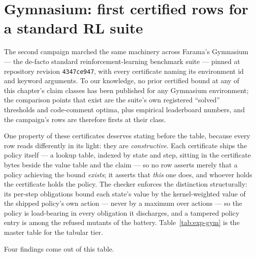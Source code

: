 \section{Gymnasium: first certified rows for a standard RL suite}
\label{sec:exp-gym}

The second campaign marched the same machinery across Farama's
Gymnasium --- the de-facto standard reinforcement-learning benchmark
suite --- pinned at repository revision \texttt{4347ce947}, with every
certificate naming its environment id and keyword arguments. To our
knowledge, no prior certified bound at any of this chapter's claim
classes has been published for any Gymnasium environment; the
comparison points that exist are the suite's own registered
``solved'' thresholds and code-comment optima, plus empirical
leaderboard numbers, and the campaign's rows are therefore firsts at
their class.

One property of these certificates deserves stating before the table,
because every row reads differently in its light: they are
\emph{constructive}. Each certificate ships the policy itself --- a
lookup table, indexed by state and step, sitting in the certificate
bytes beside the value table and the claim --- so no row asserts
merely that a policy achieving the bound \emph{exists}; it asserts
that \emph{this} one does, and whoever holds the certificate holds the
policy. The checker enforces the distinction structurally: its
per-step obligations bound each state's value by the kernel-weighted
value of the shipped policy's own action --- never by a maximum over
actions --- so the policy is load-bearing in every obligation it
discharges, and a tampered policy entry is among the refused mutants
of the battery. Table~\ref{tab:exp-gym} is the master table for the
tabular tier.

\begin{table}[htbp]
\centering\small

\caption{Certified rows for the Gymnasium tabular tier. The claim
column names the species of section~\ref{sec:exp-claims}: U2 is a
certified cost-to-goal, U3 an exact probabilistic bound. Policies are
shipped lookup tables; checks are single-core medians. ``Optimal,
exactly'' means the bound is the exact optimum of the
(deadline-truncated) environment: terminal at its claim class ---
those cells carry the exact-cell tint of
section~\ref{sec:exp-conventions}.}
\label{tab:exp-gym}
\end{table}

Four findings come out of this table.

